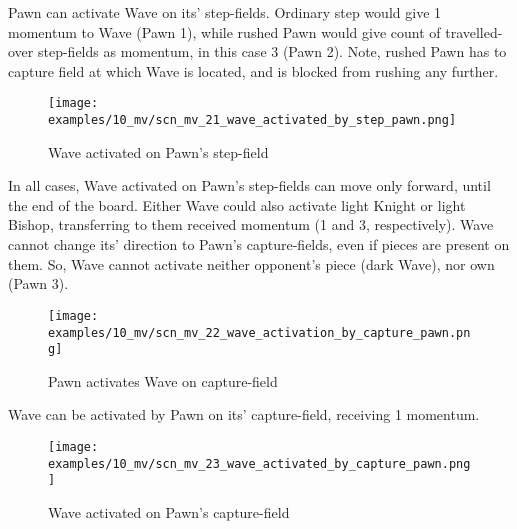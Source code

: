 Pawn can activate Wave on its' step-fields. Ordinary step would give 1 momentum to 
Wave (Pawn 1), while rushed Pawn would give count of travelled-over step-fields as 
momentum, in this case 3 (Pawn 2). Note, rushed Pawn has to capture field at which 
Wave is located, and is blocked from rushing any further.

\clearpage %

\noindent
\begin{figure}[!h]
\texttt{[image: examples/10\_mv/scn\_mv\_21\_wave\_activated\_by\_step\_pawn.png]}
\caption{Wave activated on Pawn's step-field}
\label{fig:scn_mv_21_wave_activated_by_step_pawn}
\end{figure}

In all cases, Wave activated on Pawn's step-fields can move only forward, until the end 
of the board. Either Wave could also activate light Knight or light Bishop, transferring 
to them received momentum (1 and 3, respectively). Wave cannot change its' direction to 
Pawn's capture-fields, even if pieces are present on them. So, Wave cannot activate neither 
opponent's piece (dark Wave), nor own (Pawn 3).

\clearpage %

\noindent
\begin{figure}[!h]
\texttt{[image: examples/10\_mv/scn\_mv\_22\_wave\_activation\_by\_capture\_pawn.png]}
\caption{Pawn activates Wave on capture-field}
\label{fig:scn_mv_22_wave_activation_by_capture_pawn}
\end{figure}

Wave can be activated by Pawn on its' capture-field, receiving 1 momentum.

\clearpage %

\noindent
\begin{figure}[!h]
\texttt{[image: examples/10\_mv/scn\_mv\_23\_wave\_activated\_by\_capture\_pawn.png]}
\caption{Wave activated on Pawn's capture-field}
\label{fig:scn_mv_23_wave_activated_by_capture_pawn}
\end{figure}

